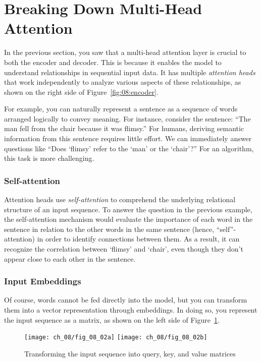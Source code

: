 \section{Breaking Down Multi-Head Attention}

In the previous section, you saw that a multi-head attention layer is crucial to both the encoder and decoder. This is because it enables the model to understand relationships in sequential input data. It has multiple \emph{attention heads} that work independently to analyze various aspects of these relationships, as shown on the right side of Figure~\ref{fig:08:encoder}.

For example, you can naturally represent a sentence as a sequence of words arranged logically to convey meaning. For instance, consider the sentence: ``The man fell from the chair because it was flimsy.'' 
For humans, deriving semantic information from this sentence requires little effort. We can immediately answer questions like ``Does `flimsy' refer to the `man' or the `chair'?'' For an algorithm, this task is more challenging.

\subsubsection{Self-attention}

Attention heads use \emph{self-attention} to comprehend the underlying relational structure of an input sequence. To answer the question in the previous example, the self-attention mechanism would evaluate the importance of each word in the sentence in relation to the other words in the same sentence (hence, ``self''-attention) in order to identify  connections between them. As a result, it can recognize the correlation between `flimsy' and `chair', even though they don't appear close to each other in the sentence.

\subsubsection{Input Embeddings}

Of course, words cannot be fed directly into the model, but you can transform them into a vector representation through embeddings. In doing so, you represent the input sequence as a matrix, as shown on the left side of Figure~\ref{fig:08:QKV}.

\begin{figure}[H]
    \texttt{[image: ch\_08/fig\_08\_02a]} %
    \texttt{[image: ch\_08/fig\_08\_02b]} %
    \caption{Transforming the input sequence into query, key, and value matrices}
    \label{fig:08:QKV}
\end{figure}

